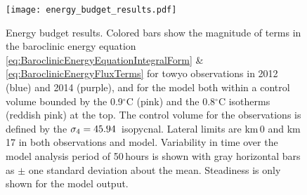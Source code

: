 \documentclass{ametsocV6.1}
\begin{document}
\begin{figure}
\centerline{\texttt{[image: energy\_budget\_results.pdf]}}
\caption{Energy budget results.
Colored bars show the magnitude of terms in the baroclinic energy equation \eqref{eq:BaroclinicEnergyEquationIntegralForm} \& \eqref{eq:BaroclinicEnergyFluxTerms} for towyo observations in 2012 (blue) and 2014 (purple), and for the model both within a control volume bounded by the 0.9$^{\circ}$C (pink) and the 0.8$^{\circ}$C isotherms (reddish pink) at the top.
The control volume for the observations is defined by the $\sigma_4=45.94$\,\TyUpperIntLimitUnit{} isopycnal.
Lateral limits are km\,0 and km\,17 in both observations and model.
Variability in time over the model analysis period of 50\,hours is shown with gray horizontal bars as $\pm$ one standard deviation about the mean.
Steadiness is only shown for the model output. 
}
\label{fig:EnergyBudgetResult}
\end{figure}
\end{document}
